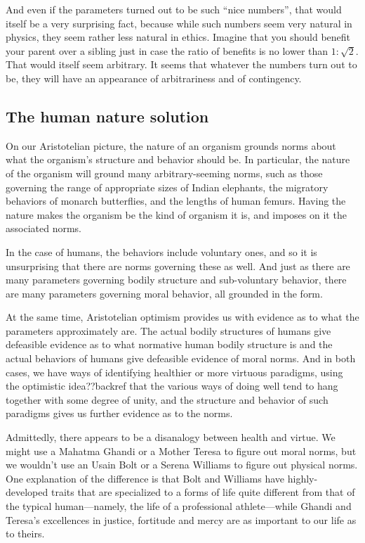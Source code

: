 And even if the parameters turned out to be such ``nice numbers'', that would itself be a very surprising fact, because while
such numbers seem very natural in physics, they seem rather less natural in ethics. Imagine that you should benefit your 
parent over a sibling just in case the ratio of benefits is no lower than $1:\sqrt{2}$. That would itself seem arbitrary.
It seems that whatever the numbers turn out to be, they will have an appearance of arbitrariness and of contingency.

\subsection{The human nature solution}
On our Aristotelian picture, the nature of an organism grounds norms about what the organism's structure and behavior 
should be. In particular, the nature of the organism will ground many arbitrary-seeming norms, such as those governing
the range of appropriate sizes of Indian elephants, the migratory behaviors of monarch butterflies, and the lengths of 
human femurs. Having the nature makes the organism be the kind of organism it is, and imposes on it the associated norms.

In the case of humans, the behaviors include voluntary ones, and so it is unsurprising that there are norms governing these
as well. And just as there are many parameters governing bodily structure and sub-voluntary behavior, there are many parameters
governing moral behavior, all grounded in the form. 

At the same time, Aristotelian optimism provides us with evidence as to what the parameters approximately are. The actual
bodily structures of humans give defeasible evidence as to what normative human bodily structure is and the actual behaviors
of humans give defeasible evidence of moral norms. And in both cases, we have ways of identifying healthier or more virtuous 
paradigms, using the optimistic idea??backref that the various ways of doing well tend to hang together with some
degree of unity, and the structure and behavior of such paradigms gives us further evidence as to the norms.

Admittedly, there appears to be a disanalogy between health and virtue. We might use a Mahatma Ghandi or a Mother Teresa to 
figure out moral norms, but we wouldn't use an Usain Bolt or a Serena Williams to figure out physical norms. One explanation 
of the difference is that Bolt and Williams have highly-developed traits that are specialized to a forms of life quite
different from that of the typical human---namely, the life of a professional athlete---while Ghandi and Teresa's excellences
in justice, fortitude and mercy are as important to our life as to theirs.

